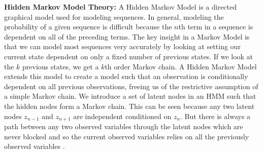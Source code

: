 \documentclass[11pt,letterpaper]{article}
\begin{document}
{\bf Hidden Markov Model Theory:} A Hidden Markov Model is a directed graphical model used for modeling sequences.
In general, modeling the probability of a given sequence is difficult because
the $n$th term in a sequence is dependent on all of the preceding terms. The key
insight in a Markov Model is that we can model most sequences very accurately
by looking at setting our current state dependent on only a fixed number of previous
states. If we look at the $k$ previous states, we get a $k$th order Markov chain.
A Hidden Markov Model extends this model to create a model such that an observation
is conditionally dependent on all previous observations, freeing us of the restrictive
assumption of a simple Markov chain. We introduce a set of latent nodes in an HMM such
that the hidden nodes form a Markov chain. This can be seen because any two latent nodes
$z_{n-1}$ and $z_{n+1}$ are independent conditioned on $z_n$. But there is always a path between any two
observed variables through the latent nodes which are never blocked and so the current
observed variables relies on all the previously observed variables \cite{bishop:607}.
\end{document}

